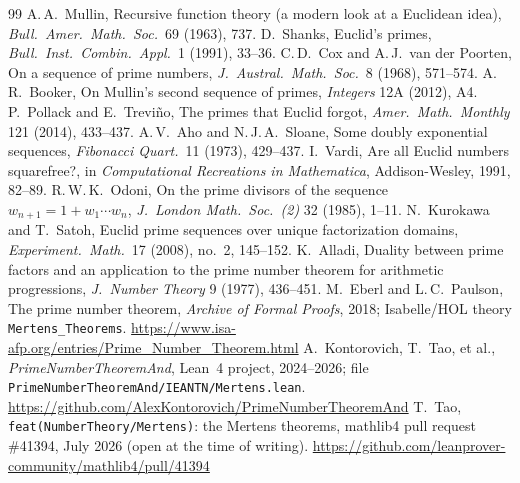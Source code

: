 \documentclass[10pt,a4paper]{article}
\begin{document}
\begin{thebibliography}{99}
 A.\,A.~Mullin, Recursive function theory (a modern look at a Euclidean idea), \emph{Bull.\ Amer.\ Math.\ Soc.}\ 69 (1963), 737.
 D.~Shanks, Euclid's primes, \emph{Bull.\ Inst.\ Combin.\ Appl.}\ 1 (1991), 33--36.
 C.\,D.~Cox and A.\,J.~van der Poorten, On a sequence of prime numbers, \emph{J.\ Austral.\ Math.\ Soc.}\ 8 (1968), 571--574.
 A.\,R.~Booker, On Mullin's second sequence of primes, \emph{Integers} 12A (2012), A4.
 P.~Pollack and E.~Trevi\~no, The primes that Euclid forgot, \emph{Amer.\ Math.\ Monthly} 121 (2014), 433--437.
 A.\,V.~Aho and N.\,J.\,A.~Sloane, Some doubly exponential sequences, \emph{Fibonacci Quart.}\ 11 (1973), 429--437.
 I.~Vardi, Are all Euclid numbers squarefree?, in \emph{Computational Recreations in Mathematica}, Addison-Wesley, 1991, 82--89.
 R.\,W.\,K.~Odoni, On the prime divisors of the sequence $w_{n+1}=1+w_1\cdots w_n$, \emph{J.\ London Math.\ Soc.\ (2)} 32 (1985), 1--11.
 N.~Kurokawa and T.~Satoh, Euclid prime sequences over unique factorization domains, \emph{Experiment.\ Math.}\ 17 (2008), no.~2, 145--152.
 K.~Alladi, Duality between prime factors and an application to the prime number theorem for arithmetic progressions, \emph{J.\ Number Theory} 9 (1977), 436--451.
 M.~Eberl and L.\,C.~Paulson, The prime number theorem, \emph{Archive of Formal Proofs}, 2018; Isabelle/HOL theory \texttt{Mertens\_Theorems}. \url{https://www.isa-afp.org/entries/Prime_Number_Theorem.html}
 A.~Kontorovich, T.~Tao, et al., \emph{PrimeNumberTheoremAnd}, Lean~4 project, 2024--2026; file \texttt{PrimeNumberTheoremAnd/IEANTN/Mertens.lean}. \url{https://github.com/AlexKontorovich/PrimeNumberTheoremAnd}
 T.~Tao, \texttt{feat(NumberTheory/Mertens)}: the Mertens theorems, mathlib4 pull request \#41394, July 2026 (open at the time of writing). \url{https://github.com/leanprover-community/mathlib4/pull/41394}
\end{thebibliography}
\end{document}
